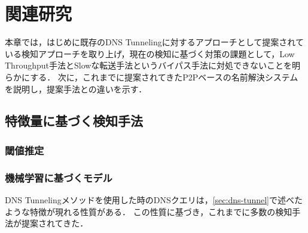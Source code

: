 \section{関連研究}
\label{sec:related-works}
本章では，はじめに既存のDNS Tunnelingに対するアプローチとして提案されている検知アプローチを取り上げ，現在の検知に基づく対策の課題として，Low Throughput手法とSlowな転送手法というバイパス手法に対処できないことを明らかにする．
次に，これまでに提案されてきたP2Pベースの名前解決システムを説明し，提案手法との違いを示す．

\subsection{特徴量に基づく検知手法}
\subsubsection{閾値推定}
\subsubsection{機械学習に基づくモデル}
DNS Tunnelingメソッドを使用した時のDNSクエリは，\ref{sec:dns-tunnel}で述べたような特徴が現れる性質がある．
この性質に基づき，これまでに多数の検知手法が提案されてきた．


